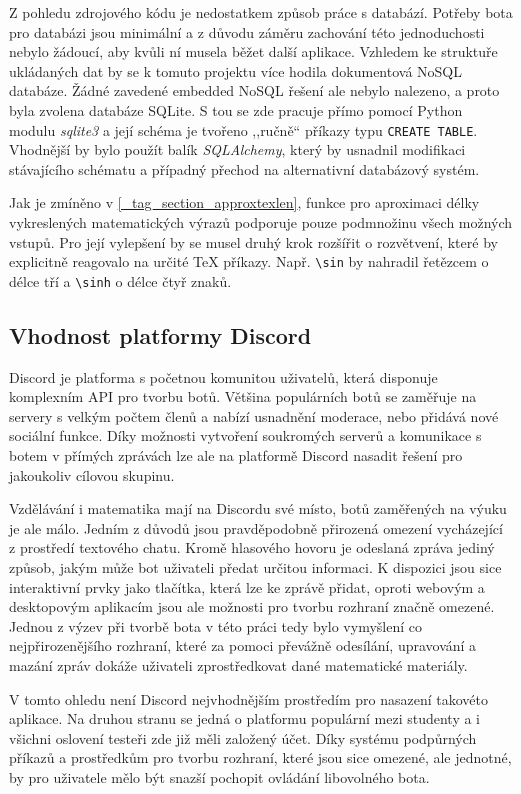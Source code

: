 \documentclass[FM]{tulthesis}
\begin{document}
	Z pohledu zdrojového kódu je nedostatkem způsob práce s databází. Potřeby bota pro databázi jsou minimální a z důvodu záměru zachování této jednoduchosti nebylo žádoucí, aby kvůli ní musela běžet další aplikace. Vzhledem ke struktuře ukládaných dat by se k tomuto projektu více hodila dokumentová NoSQL databáze. Žádné zavedené embedded NoSQL řešení ale nebylo nalezeno, a proto byla zvolena databáze SQLite. S tou se zde pracuje přímo pomocí Python modulu \textit{sqlite3} a její schéma je tvořeno ,,ručně`` příkazy typu \verb|CREATE TABLE|. Vhodnější by bylo použít balík \textit{SQLAlchemy}, který by usnadnil modifikaci stávajícího schématu a případný přechod na alternativní databázový systém.
	
	Jak je zmíněno v \ref{_tag_section_approxtexlen}, funkce pro aproximaci délky vykreslených matematických výrazů podporuje pouze podmnožinu všech možných vstupů. Pro její vylepšení by se musel druhý krok rozšířit o rozvětvení, které by explicitně reagovalo na určité TeX příkazy. Např. \verb|\sin| by nahradil řetězcem o délce tří a \verb|\sinh| o délce čtyř znaků. 

	\subsection{Vhodnost platformy Discord}
	
	Discord je platforma s početnou komunitou uživatelů, která disponuje komplexním API pro tvorbu botů. Většina populárních botů se zaměřuje na servery s velkým počtem členů a nabízí usnadnění moderace, nebo přidává nové sociální funkce. Díky možnosti vytvoření soukromých serverů a komunikace s botem v přímých zprávách lze ale na platformě Discord nasadit řešení pro jakoukoliv cílovou skupinu.
	
	Vzdělávání i matematika mají na Discordu své místo, botů zaměřených na výuku je ale málo. Jedním z důvodů jsou pravděpodobně přirozená omezení vycházející z prostředí textového chatu. Kromě hlasového hovoru je odeslaná zpráva jediný způsob, jakým může bot uživateli předat určitou informaci. K dispozici jsou sice interaktivní prvky jako tlačítka, která lze ke zprávě přidat, oproti webovým a desktopovým aplikacím jsou ale možnosti pro tvorbu rozhraní značně omezené. Jednou z výzev při tvorbě bota v této práci tedy bylo vymyšlení co nejpřirozenějšího rozhraní, které za pomoci převážně odesílání, upravování a mazání zpráv dokáže uživateli zprostředkovat dané matematické materiály.
	
	V tomto ohledu není Discord nejvhodnějším prostředím pro nasazení takovéto aplikace. Na druhou stranu se jedná o platformu populární mezi studenty a i všichni oslovení testeři zde již měli založený účet. Díky systému podpůrných příkazů a prostředkům pro tvorbu rozhraní, které jsou sice omezené, ale jednotné, by pro uživatele mělo být snazší pochopit ovládání libovolného bota.
	
\end{document}
